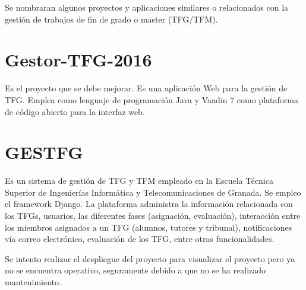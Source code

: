 Se nombraran algunos proyectos y aplicaciones similares o relacionados con la gestión de trabajos de fin de grado o master (TFG/TFM).

\section{Gestor-TFG-2016}
Es el proyecto que se debe mejorar. Es una aplicación Web para la gestión de TFG. Emplea como lenguaje de programación Java y Vaadin 7 como plataforma de código abierto para la interfaz web.

\section{GESTFG}
Es un sistema de gestión de TFG y TFM empleado en la Escuela Técnica Superior de Ingenierías Informática y Telecomunicaciones de Granada. Se empleo el framework Django. La plataforma administra la información relacionada con los TFGs, usuarios, las diferentes fases (asignación, evaluación), interacción entre los miembros asignados a un TFG (alumnos, tutores y tribunal), notificaciones vía correo electrónico, evaluación de los TFG, entre otras funcionalidades.

Se intento realizar el despliegue del proyecto para visualizar el proyecto pero ya no se encuentra operativo, seguramente debido a que no se ha realizado mantenimiento.

                                                                                                                                






